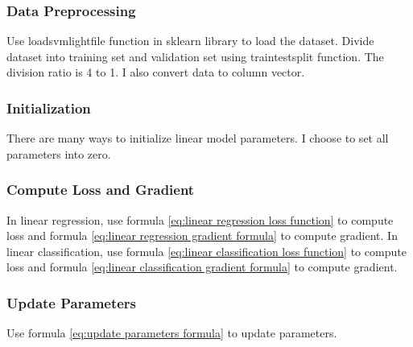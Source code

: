 \documentclass[journal, a4paper]{IEEEtran}
\begin{document}
\subsubsection{Data Preprocessing}
Use load\textunderscore svmlight\textunderscore file function in sklearn library to load the dataset.
Divide dataset into training set and validation set using train\textunderscore test\textunderscore split function.
The division ratio is 4 to 1.
I also convert data to column vector.


\subsubsection{Initialization}
There are many ways to initialize linear model parameters.
I choose to set all parameters into zero.
\subsubsection{Compute Loss and Gradient} \label{compute loss and gradient}
In linear regression, use formula \eqref{eq:linear regression loss function} to compute loss and formula \eqref{eq:linear regression gradient formula} to compute gradient.
In linear classification, use formula \eqref{eq:linear classification loss function} to compute loss and formula \eqref{eq:linear classification gradient formula} to compute gradient.






\subsubsection{Update Parameters} \label{update parameters}
Use formula \eqref{eq:update parameters formula} to update parameters.
\end{document}
